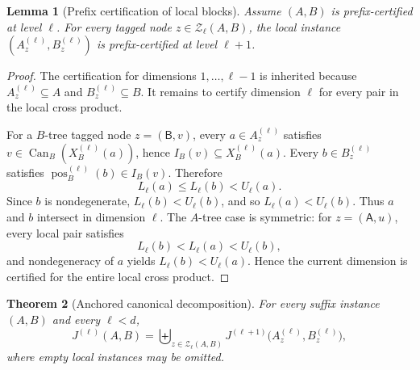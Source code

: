 \documentclass[11pt]{article}
\newcommand{\Can}{\operatorname{Can}}
\newcommand{\pos}{\operatorname{pos}}
\newcommand{\Znodes}{\mathcal Z}
\newcommand{\sideA}{\ensuremath{\mathsf A}}
\newcommand{\sideB}{\ensuremath{\mathsf B}}
\newtheorem{theorem}{Theorem}[section]
\newtheorem{lemma}[theorem]{Lemma}
\theoremstyle{definition}
\begin{document}
\begin{lemma}[Prefix certification of local blocks]
\label{lem:prefix-certification}
Assume $(A,B)$ is prefix-certified at level $\ell$.  For every tagged node $z\in\Znodes_\ell(A,B)$, the local instance $(A_z^{(\ell)},B_z^{(\ell)})$ is prefix-certified at level $\ell+1$.
\end{lemma}

\begin{proof}
The certification for dimensions $1,\ldots,\ell-1$ is inherited because $A_z^{(\ell)}\subseteq A$ and $B_z^{(\ell)}\subseteq B$.  It remains to certify dimension $\ell$ for every pair in the local cross product.

For a $B$-tree tagged node $z=(\sideB,v)$, every $a\in A_z^{(\ell)}$ satisfies $v\in\Can_B(X_B^{(\ell)}(a))$, hence $I_B(v)\subseteq X_B^{(\ell)}(a)$.  Every $b\in B_z^{(\ell)}$ satisfies $\pos_B^{(\ell)}(b)\in I_B(v)$.  Therefore
\[
  L_\ell(a)\le L_\ell(b)<U_\ell(a).
\]
Since $b$ is nondegenerate, $L_\ell(b)<U_\ell(b)$, and so $L_\ell(a)<U_\ell(b)$.  Thus $a$ and $b$ intersect in dimension $\ell$.  The $A$-tree case is symmetric: for $z=(\sideA,u)$, every local pair satisfies
\[
  L_\ell(b)<L_\ell(a)<U_\ell(b),
\]
and nondegeneracy of $a$ yields $L_\ell(b)<U_\ell(a)$.  Hence the current dimension is certified for the entire local cross product.
\end{proof}

\begin{theorem}[Anchored canonical decomposition]
\label{thm:decomposition}
For every suffix instance $(A,B)$ and every $\ell<d$,
\[
  J^{(\ell)}(A,B)=
  \biguplus_{z\in\Znodes_\ell(A,B)}
  J^{(\ell+1)}\bigl(A_z^{(\ell)},B_z^{(\ell)}\bigr),
\]
where empty local instances may be omitted.
\end{theorem}
\end{document}
